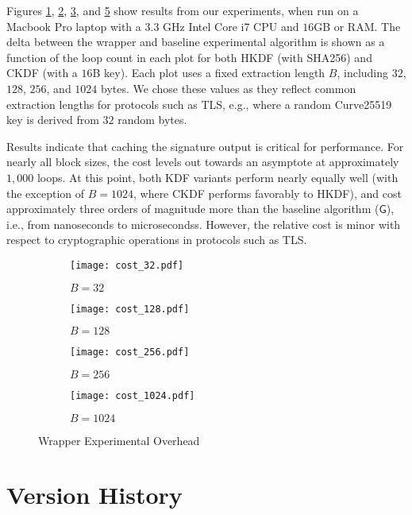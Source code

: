 \documentclass{article}
\begin{document}
{\begin{appendix}
Figures \ref{fig:exp-a}, \ref{fig:exp-b}, \ref{fig:exp-c}, and \ref{fig:exp-d} show results
from our experiments, when run on a Macbook Pro laptop with a $3.3$ GHz Intel Core i7 CPU and
$16$GB or RAM. The delta between the wrapper and baseline experimental algorithm is shown
as a function of the loop count in each plot for both HKDF (with SHA256) and CKDF (with a $16$B
key). Each plot uses a fixed extraction length $B$, including $32$, $128$, $256$, and $1024$ bytes.
We chose these values as they reflect common extraction lengths for protocols such as TLS, e.g.,
where a random Curve25519 key is derived from $32$ random bytes.

Results indicate that caching the signature output is critical for performance. For nearly
all block sizes, the cost levels out towards an asymptote at approximately $1,000$ loops.
At this point, both KDF variants perform nearly equally well (with the exception of $B = 1024$,
where CKDF performs favorably to HKDF), and cost approximately three orders of magnitude
more than the baseline algorithm ($\mathsf{G}$), i.e., from nanoseconds to microsecondss.
However, the relative cost is minor with respect to cryptographic operations in protocols
such as TLS.

\begin{figure}[H]
	\begin{subfigure}{.5\textwidth}
		\centering
		\texttt{[image: cost\_32.pdf]}
		\caption{$B = 32$}
		\label{fig:exp-a}
	\end{subfigure}
	\hfill
	\begin{subfigure}{.5\textwidth}
		\centering
		\texttt{[image: cost\_128.pdf]}
		\caption{$B = 128$}
		\label{fig:exp-b}
	\end{subfigure}
	\hfill
	\begin{subfigure}{.5\textwidth}
		\centering
		\texttt{[image: cost\_256.pdf]}
		\caption{$B = 256$}
		\label{fig:exp-c}
	\end{subfigure}
	\begin{subfigure}{.5\textwidth}
		\centering
		\texttt{[image: cost\_1024.pdf]}
		\caption{$B = 1024$}
		\label{fig:exp-d}
	\end{subfigure}
	\caption{Wrapper Experimental Overhead}
\end{figure}


\section{Version History}


\end{appendix}}
\end{document}

